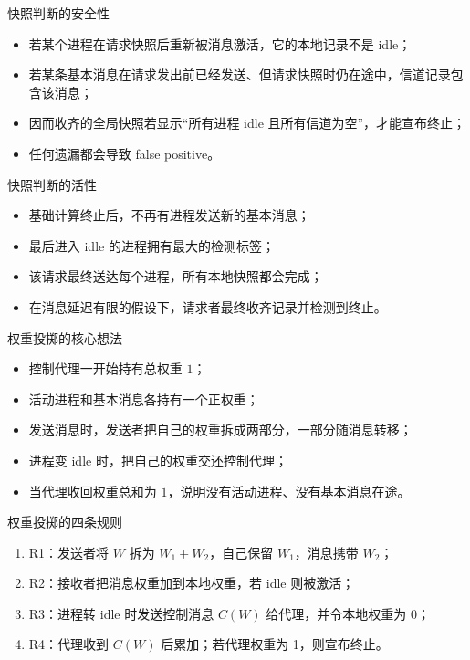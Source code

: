 \documentclass[UTF8,fontset=none,aspectratio=169,10pt]{beamer}
\begin{document}
\begin{frame}{快照判断的安全性}
\begin{itemize}
  \item 若某个进程在请求快照后重新被消息激活，它的本地记录不是 idle；
  \item 若某条基本消息在请求发出前已经发送、但请求快照时仍在途中，信道记录包含该消息；
  \item 因而收齐的全局快照若显示“所有进程 idle 且所有信道为空”，才能宣布终止；
  \item 任何遗漏都会导致 false positive。
\end{itemize}
\end{frame}

\begin{frame}{快照判断的活性}
\begin{itemize}
  \item 基础计算终止后，不再有进程发送新的基本消息；
  \item 最后进入 idle 的进程拥有最大的检测标签；
  \item 该请求最终送达每个进程，所有本地快照都会完成；
  \item 在消息延迟有限的假设下，请求者最终收齐记录并检测到终止。
\end{itemize}
\vfill
{}
\end{frame}


\begin{frame}{权重投掷的核心想法}
\begin{itemize}
  \item 控制代理一开始持有总权重 $1$；
  \item 活动进程和基本消息各持有一个正权重；
  \item 发送消息时，发送者把自己的权重拆成两部分，一部分随消息转移；
  \item 进程变 idle 时，把自己的权重交还控制代理；
  \item 当代理收回权重总和为 $1$，说明没有活动进程、没有基本消息在途。
\end{itemize}
\end{frame}

\begin{frame}{权重投掷的四条规则}
\scriptsize
\begin{enumerate}
  \item R1：发送者将 $W$ 拆为 $W_1+W_2$，自己保留 $W_1$，消息携带 $W_2$；
  \item R2：接收者把消息权重加到本地权重，若 idle 则被激活；
  \item R3：进程转 idle 时发送控制消息 $C(W)$ 给代理，并令本地权重为 0；
  \item R4：代理收到 $C(W)$ 后累加；若代理权重为 1，则宣布终止。
\end{enumerate}
\vfill
{}
\end{frame}
\end{document}
